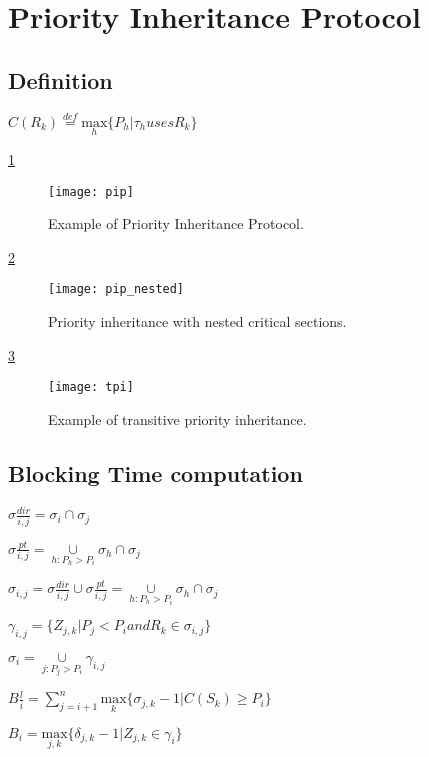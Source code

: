 \section{Priority Inheritance Protocol}

\subsection{Definition}

$C(R_{k})\stackrel{def}{=}\underset{h}{\mathrm{max}} \{P_{h}| \tau_{h} uses R_{k}\}  $

\ref{fig:pip}
\begin{figure}[h]
    \centering
    \texttt{[image: pip]}
    \caption{Example of Priority Inheritance Protocol. \cite{b5}}
    \label{fig:pip}
\end{figure}

\ref{fig:pip_nested}
\begin{figure}[h]
    \centering
    \texttt{[image: pip\_nested]}
    \caption{Priority inheritance with nested critical sections.\cite{b5}}
    \label{fig:pip_nested}
\end{figure}

\ref{fig:tpi}
\begin{figure}[h]
    \centering
    \texttt{[image: tpi]}
    \caption{Example of transitive priority inheritance.\cite{b5}}
    \label{fig:tpi}
\end{figure}

\subsection{Blocking Time computation}

$ \sigma \frac{dir}{i,j} =  \sigma_{i} \cap \sigma_{j} $

$ \sigma \frac{pt}{i,j} =  \underset{h:P_{h}>P_{i}}{\cup} \sigma_{h} \cap \sigma_{j} $


 $ \sigma_{i,j} = \sigma \frac{dir}{i,j}\cup\sigma \frac{pt}{i,j} =  \underset{h:P_{h}>P_{i}}{\cup} \sigma_{h} \cap \sigma_{j} $

$ \gamma_{i,j}=\{Z_{j,k} | P_{j}<P_{i} and R_{k}\in \sigma_{i,j} \} $

$ \sigma_{i} =\underset{j:P_{j}>P_{i}}{\cup} \gamma_{i,j}$


$ B \frac{l}{i} =\sum_{j=i+1}^{n} \underset{k}{\mathrm{max}} \{\sigma_{j,k}-1| C(S_{k})\geq P_{i}\}$

$ B_{i} =\underset{j,k}{\mathrm{max}} \{\delta_{j,k}-1| Z_{j,k}\in \gamma_{i}\}$

